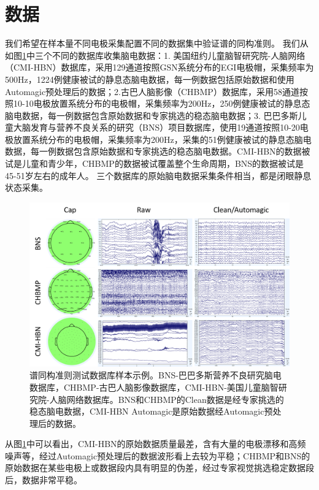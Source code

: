 \section{数据}
我们希望在样本量不同电极采集配置不同的数据集中验证谱的同构准则。 我们从如图\ref{fig3}中三个不同的数据库收集脑电数据：1. 美国纽约儿童脑智研究院-人脑网络（CMI-HBN）数据库，采用129通道按照GSN系统分布的EGI电极帽，采集频率为500Hz，1224例健康被试的静息态脑电数据，每一例数据包括原始数据和使用Automagic预处理后的数据；2.古巴人脑影像（CHBMP）数据库，采用58通道按照10-10电极放置系统分布的电极帽，采集频率为200Hz，250例健康被试的静息态脑电数据，每一例数据包含原始数据和专家挑选的稳态脑电数据；3. 巴巴多斯儿童大脑发育与营养不良关系的研究（BNS）项目数据库，使用19通道按照10-20电极放置系统分布的电极帽，采集频率为200Hz，采集的51例健康被试的静息态脑电数据，每一例数据包含原始数据和专家挑选的稳态脑电数据。CMI-HBN的数据被试是儿童和青少年，CHBMP的数据被试覆盖整个生命周期，BNS的数据被试是45-51岁左右的成年人。 三个数据库的原始脑电数据采集条件相当，都是闭眼静息状态采集。
\begin{figure}
\includegraphics[width=15cm]{pic/palos/data.png}
\caption{谱同构准则测试数据库样本示例。BNS-巴巴多斯营养不良研究脑电数据库，CHBMP-古巴人脑影像数据库，CMI-HBN-美国儿童脑智研究院-人脑网络数据库。BNS和CHBMP的Clean数据是经专家挑选的稳态脑电数据，CMI-HBN Automagic是原始数据经Automagic预处理后的数据。}
\label{fig3}
\end{figure}

从图\ref{fig3}中可以看出，CMI-HBN的原始数据质量最差，含有大量的电极漂移和高频噪声等，经过Automagic预处理后的数据波形看上去较为平稳；CHBMP和BNS的原始数据在某些电极上或数据段内具有明显的伪差，经过专家视觉挑选稳定数据段后，数据非常平稳。



